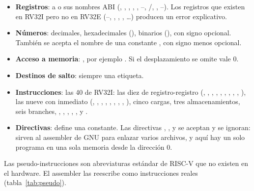 \begin{itemize}
  \item \textbf{Registros}:  a  o sus nombres ABI (,
        , , , , --,
        /, , --). Los registros que
        existen en RV32I pero no en RV32E (--, ,
        , , \ldots) producen un error explicativo.
  \item \textbf{Números}: decimales, hexadecimales (), binarios (),
        con signo opcional. También se acepta el nombre de una constante ,
        con signo menos opcional.
  \item \textbf{Acceso a memoria}: , por ejemplo
        . Si el desplazamiento se omite vale 0.
  \item \textbf{Destinos de salto}: siempre una etiqueta.
  \item \textbf{Instrucciones}: las 40 de RV32I: las diez de registro-registro
        (, , , , , ,
        , , , ), las nueve con inmediato
        (, , , , , ,
        , , ), cinco cargas, tres almacenamientos,
        seis branches, , , , , ,
         y .
  \item \textbf{Directivas}:  define una constante. Las
        directivas , ,  y  se
        aceptan y se ignoran: sirven al assembler de GNU para enlazar varios archivos,
        y aquí hay un solo programa en una sola memoria desde la dirección 0.
\end{itemize}

Las pseudo-instrucciones son abreviaturas estándar de RISC-V \cite{riscv-unpriv} que
no existen en el hardware. El assembler las reescribe como instrucciones reales
(tabla~\ref{tab:pseudo}).

